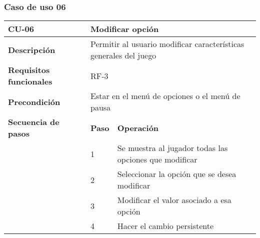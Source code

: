 \subsubsection{Caso de uso 06}
\begin{longtable}{lll}
\textbf{CU-06}                                   & \multicolumn{2}{l}{Modificar opción}                                                                                                                                               \\ \hline
\endfirsthead
%
\endhead
%
\textbf{Descripción}                             & \multicolumn{2}{l}{Permitir al usuario modificar características generales del juego}                                                                                              \\ \hline
\textbf{Requisitos funcionales}                  & \multicolumn{2}{l}{RF-3}                                                                                                                                                   \\ \hline
\textbf{Precondición}                            & \multicolumn{2}{l}{Estar en el menú de opciones o el menú de pausa}                                                                                                                \\ \hline
\multicolumn{1}{l|}{\textbf{Secuencia de pasos}} & \textbf{Paso}                                                        & \textbf{Operación}                                                                                          \\ \cline{2-3} 
\multicolumn{1}{l|}{}                            & 1                                                                    & Se muestra al jugador todas las opciones que modificar                                                      \\
\multicolumn{1}{l|}{}                            & 2                                                                    & Seleccionar la opción que se desea modificar                                                                \\
\multicolumn{1}{l|}{}                            & 3                                                                    & Modificar el valor asociado a esa opción                                                                    \\
\multicolumn{1}{l|}{}                            & 4                                                                    & Hacer el cambio persistente                                                                                 \\ \hline

\end{longtable}
